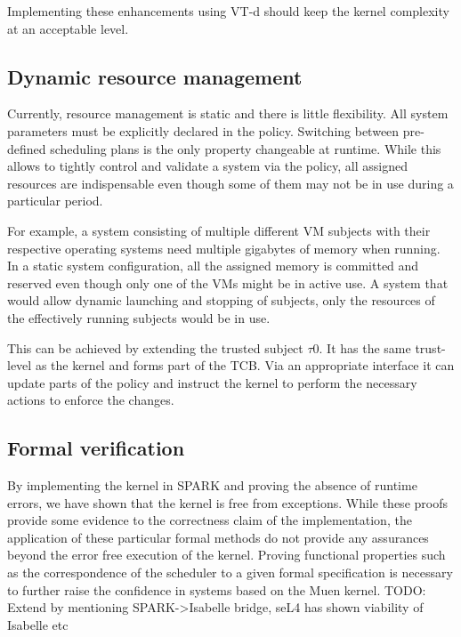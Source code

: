Implementing these enhancements using VT-d should keep the kernel complexity at
an acceptable level.

\subsection{Dynamic resource management}
Currently, resource management is static and there is little flexibility. All
system parameters must be explicitly declared in the policy. Switching between
pre-defined scheduling plans is the only property changeable at runtime. While
this allows to tightly control and validate a system via the policy, all
assigned resources are indispensable even though some of them may not be in use
during a particular period.

For example, a system consisting of multiple different VM subjects with their
respective operating systems need multiple gigabytes of memory when running.
In a static system configuration, all the assigned memory is committed and
reserved even though only one of the VMs might be in active use. A system that
would allow dynamic launching and stopping of subjects, only the resources of
the effectively running subjects would be in use.

This can be achieved by extending the trusted subject $\tau$0. It has the same
trust-level as the kernel and forms part of the TCB. Via an appropriate
interface it can update parts of the policy and instruct the kernel to perform
the necessary actions to enforce the changes.

\subsection{Formal verification}
By implementing the kernel in SPARK and proving the absence of runtime errors,
we have shown that the kernel is free from exceptions. While these proofs
provide some evidence to the correctness claim of the implementation, the
application of these particular formal methods do not provide any assurances
beyond the error free execution of the kernel. Proving functional properties
such as the correspondence of the scheduler to a given formal specification is
necessary to further raise the confidence in systems based on the Muen kernel.
TODO: Extend by mentioning SPARK->Isabelle bridge, seL4 has shown viability of
      Isabelle etc
